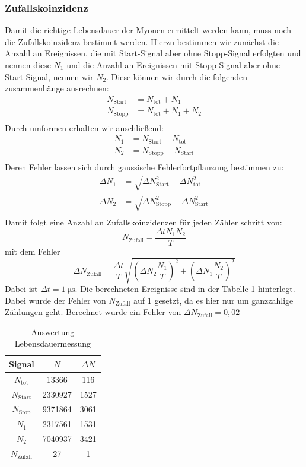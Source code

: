 \documentclass{article}
\begin{document}
\subsubsection*{Zufallskoinzidenz}
Damit die richtige Lebensdauer der Myonen ermittelt werden kann, muss noch die Zufallskoinzidenz bestimmt werden.
Hierzu bestimmen wir zunächst die Anzahl an Ereignissen, die mit Start-Signal aber ohne Stopp-Signal erfolgten und nennen diese $N_1$ und 
die Anzahl an Ereignissen mit Stopp-Signal aber ohne Start-Signal, nennen wir $N_2$.
Diese können wir durch die folgenden zusammenhänge ausrechnen:
\begin{align*}
    N_\text{Start}&=N_\text{tot}+N_1 \\
    N_\text{Stopp}&=N_\text{tot}+N_1+N_2 \\
\end{align*}
Durch umformen erhalten wir anschließend:
\begin{align*}
    N_1&=N_\text{Start}-N_\text{tot} \\
    N_2&=N_\text{Stopp}-N_\text{Start} \\
\end{align*}
Deren Fehler lassen sich durch gaussische Fehlerfortpflanzung bestimmen zu:
\begin{align*}
    \Delta N_1&=\sqrt{\Delta N^2_\text{Start}-\Delta N^2_\text{tot}} \\
    \Delta N_2&=\sqrt{\Delta N^2_\text{Stopp}-\Delta N^2_\text{Start}} \\
\end{align*}
Damit folgt eine Anzahl an Zufallskoinzidenzen für jeden Zähler schritt von:
\begin{displaymath}
    N_\text{Zufall}=\frac{\Delta t N_1 N_2}{T}
\end{displaymath}
mit dem Fehler
\begin{displaymath}
    \Delta N_\text{Zufall}=\frac{\Delta t}{T}\sqrt{\left( \Delta N_2 \frac{N_1}{T} \right)^2 + \left( \Delta N_1 \frac{N_2}{T} \right)^2}
\end{displaymath}
Dabei ist $\Delta t=\SI{1}{\micro\s}$.
Die berechneten Ereignisse sind in der Tabelle \ref{tab:AuswertungLebensdauer} hinterlegt. Dabei wurde der Fehler von $N_\text{Zufall}$ auf 1 gesetzt, da es hier nur um ganzzahlige Zählungen geht.
Berechnet wurde ein Fehler von $\Delta N_\text{Zufall}=0,02$
\begin{table}[H]
    \centering
    \caption{Auswertung Lebensdauermessung}
    \begin{tabular}{|c|c|c|}
        \hline
        Signal & $N$ & $\Delta N$\\ \hline \hline
        $N_\text{tot}$ & 13366 & 116 \\ \hline
        $N_\text{Start}$ & 2330927 & 1527 \\ \hline
        $N_\text{Stop}$ & 9371864 & 3061 \\ \hline
        $N_1$ & 2317561 & 1531 \\ \hline
        $N_2$ & 7040937 & 3421 \\ \hline
        $N_\text{Zufall}$ & 27 & 1 \\ \hline
    \end{tabular}
    \label{tab:AuswertungLebensdauer}
\end{table}
\end{document}

